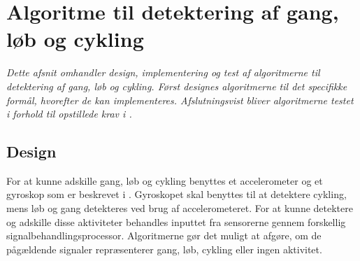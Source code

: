 \section{Algoritme til detektering af gang, løb og cykling}
\textit{Dette afsnit omhandler design, implementering og test af algoritmerne til detektering af gang, løb og cykling. Først designes algoritmerne til det specifikke formål, hvorefter de kan implementeres. Afslutningsvist bliver algoritmerne testet i forhold til opstillede krav i .} 

\subsection{Design}
For at kunne adskille gang, løb og cykling benyttes et accelerometer og et gyroskop som er beskrevet i . Gyroskopet skal benyttes til at detektere cykling, mens løb og gang detekteres ved brug af accelerometeret. For at kunne detektere og adskille disse aktiviteter behandles inputtet fra sensorerne gennem forskellig signalbehandlingsprocessor. Algoritmerne gør det muligt at afgøre, om de pågældende signaler repræsenterer gang, løb, cykling eller ingen aktivitet. 

